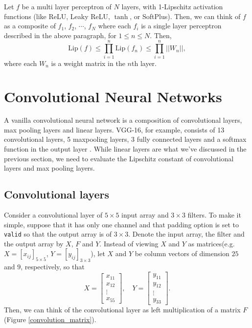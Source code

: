 \documentclass[11pt]{report}
\newcommand\lip{\ensuremath{\text{Lip}}}
\begin{document}
Let \(f\) be a multi layer perceptron of \(N\) layers, with 1-Lipschitz activation functions (like ReLU, Leaky ReLU, \(\tanh\), or SoftPlus).
Then, we can think of \(f\) as a composite of \(f_1\), \(f_2\), \(\cdots\), \(f_N\) where each \(f_i\) is a single layer perceptron described in the above paragraph, for \(1\le n\le N\).
Then,
\[\lip(f)\le\prod_{i=1}^n\lip(f_n)\le\prod_{i=1}^n||W_n||,\]
where each \(W_n\) is a weight matrix in the \(n\)th layer.

\section{Convolutional Neural Networks}

A vanilla convolutional neural network is a composition of convolutional layers, max pooling layers and linear layers.
VGG-16, for example, consists of 13 convolutional layers, 5 maxpooling layers, 3 fully connected layers and a softmax function in the output layer \cite{SK-ZA}.
While linear layers are what we've discussed in the previous section, we need to evaluate the Lipschitz constant of convolutional layers and max pooling layers.

\subsection{Convolutional layers}\label{convolutional_layers}
Consider a convolutional layer of \(5\times 5\) input array and \(3\times 3\) filters.
To make it simple, suppose that it has only one channel and that padding option is set to \texttt{valid} so that the output array is of \(3\times 3\).
Denote the input array, the filter and the output array by \(X\), \(F\) and \(Y\).
Instead of viewing \(X\) and \(Y\) as matrices(e.g. \(X=[x_{ij}]_{5\times 5}\), \(Y=[y_{ij}]_{3\times 3}\)), let \(X\) and \(Y\) be column vectors of dimension \(25\) and \(9\), respectively, so that
\[X=\begin{bmatrix}x_{11}\\x_{12}\\\vdots\\x_{55}\end{bmatrix},\quad
Y=\begin{bmatrix}y_{11}\\y_{12}\\\vdots\\y_{33}\end{bmatrix}.\]
Then, we can think of the convolutional layer as left multiplication of a matrix \(F\) (Figure \ref{convolution_matrix}).
\end{document}
